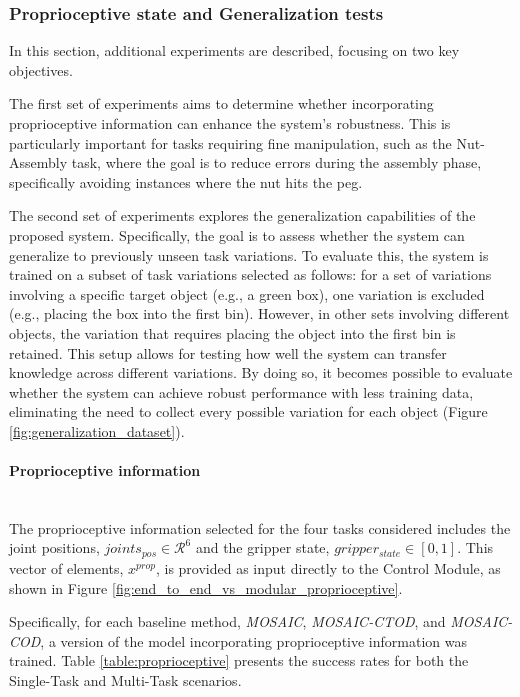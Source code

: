\subsubsection{Proprioceptive state and Generalization tests}



In this section, additional experiments are described, focusing on two key objectives.

The first set of experiments aims to determine whether incorporating proprioceptive information can enhance the system's robustness. This is particularly important for tasks requiring fine manipulation, such as the Nut-Assembly task, where the goal is to reduce errors during the assembly phase, specifically avoiding instances where the nut hits the peg.

The second set of experiments explores the generalization capabilities of the proposed system. Specifically, the goal is to assess whether the system can generalize to previously unseen task variations. To evaluate this, the system is trained on a subset of task variations selected as follows: for a set of variations involving a specific target object (e.g., a green box), one variation is excluded (e.g., placing the box into the first bin). However, in other sets involving different objects, the variation that requires placing the object into the first bin is retained. This setup allows for testing how well the system can transfer knowledge across different variations. By doing so, it becomes possible to evaluate whether the system can achieve robust performance with less training data, eliminating the need to collect every possible variation for each object (Figure \ref{fig:generalization_dataset}).


\paragraph*{Proprioceptive information}\mbox{}\\
The proprioceptive information selected for the four tasks considered includes the joint positions, $joints_{pos} \in \mathcal{R}^{6}$ and the gripper state, $gripper_{state} \in \left[ 0, 1 \right]$. This vector of elements, $x^{prop}$, is provided as input directly to the Control Module, as shown in Figure \ref{fig:end_to_end_vs_modular_proprioceptive}. 

Specifically, for each baseline method, \textit{MOSAIC}, \textit{MOSAIC-CTOD}, and \textit{MOSAIC-COD}, a version of the model incorporating proprioceptive information was trained. Table \ref{table:proprioceptive} presents the success rates for both the Single-Task and Multi-Task scenarios. 

